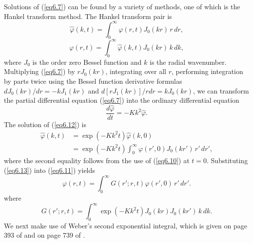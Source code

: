 \documentclass[10pt]{article}
\begin{document}
     Solutions of (\ref{eq6.7}) can be found by a variety of methods,
one of which is the Hankel transform method. The Hankel transform pair
is %
\begin{equation}                                  %
   \hat{\varphi}(k,t) = \int_0^\infty \varphi(r,t) J_0(kr) \, r \, dr,
\label{eq6.10}
\end{equation}
\begin{equation}                                  %
         \varphi(r,t) = \int_0^\infty \hat{\varphi}(k,t) J_0(kr) \, k \, dk,
\label{eq6.11}
\end{equation}
where $J_0$ is the order zero Bessel function and $k$ is the radial wavenumber.
Multiplying (\ref{eq6.7}) by $rJ_0(kr)$, integrating over all $r$, performing
integration by parts twice  using the Bessel function derivative formulas
$dJ_0(kr)/dr=-kJ_1(kr)$ and $d[rJ_1(kr)]/rdr=kJ_0(kr)$, we can transform the
partial differential equation (\ref{eq6.7}) into the ordinary differential equation
\begin{equation}                                  %
       \frac{d\hat{\varphi}}{dt} = -K k^2 \hat{\varphi}.
\label{eq6.12}
\end{equation}
The solution of (\ref{eq6.12}) is
\begin{equation}                                  %
  \begin{split}
     \hat{\varphi}(k,t) &= \exp(-Kk^2t) \hat{\varphi}(k,0)        \\
                        &= \exp(-Kk^2t) \int_0^\infty \varphi(r',0) J_0(kr') \, r' \, dr',
\end{split}
\label{eq6.13}
\end{equation}
where the second equality follows from the use of (\ref{eq6.10}) at $t=0$.
Substituting (\ref{eq6.13}) into (\ref{eq6.11}) yields
\begin{equation}                                  %
     \varphi(r,t) = \int_0^\infty G(r';r,t) \varphi(r',0)\, r' \, dr'.
\label{eq6.14}
\end{equation}
where
\begin{equation}                                  %
          G(r';r,t) = \int_0^\infty  \exp(-Kk^2t) J_0(kr) J_0(kr') \, k \, dk.
\label{eq6.15}
\end{equation}
We next make use of Weber's second exponential integral, which is given on
page 393 of \citet{watson95} and on page 739 of \citet{gradshteyn+ryzhik94}.
\end{document}
